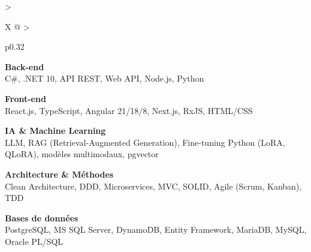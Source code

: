 \documentclass[10pt,a4paper]{article}
\begin{document}
\begin{tabularx}{\textwidth}{
  >{\raggedright\arraybackslash}X
  @{\hspace{1cm}}
  >{\raggedright\arraybackslash}p{0.32\textwidth}
}
\begin{minipage}[t]{\linewidth}
\vspace{4pt}

\textbf{\color{primary} Back-end}\\
\color{darkgray} C\#, .NET 10, API REST, Web API, Node.js, Python

\vspace{4pt}

\textbf{\color{primary} Front-end}\\
\color{darkgray} React.js, TypeScript, Angular 21/18/8, Next.js, RxJS, HTML/CSS

\vspace{4pt}

\textbf{\color{primary} IA \& Machine Learning}\\
\color{darkgray} LLM, RAG (Retrieval-Augmented Generation), Fine-tuning Python (LoRA, QLoRA), modèles multimodaux, pgvector

\vspace{4pt}

\textbf{\color{primary} Architecture \& Méthodes}\\
\color{darkgray} Clean Architecture, DDD, Microservices, MVC, SOLID, Agile (Scrum, Kanban), TDD

\vspace{4pt}

\textbf{\color{primary} Bases de données}\\
\color{darkgray} PostgreSQL, MS SQL Server, DynamoDB, Entity Framework, MariaDB, MySQL, Oracle PL/SQL

\vspace{4pt}

\end{minipage}
\\
\end{tabularx}
\end{document}
